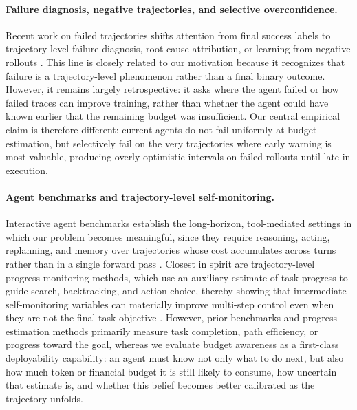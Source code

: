 \paragraph{Failure diagnosis, negative trajectories, and selective overconfidence.}
Recent work on failed trajectories shifts attention from final success labels to trajectory-level failure diagnosis, root-cause attribution, or learning from negative rollouts \cite{wang2024learningfromfailure,barke2026agentrx}. This line is closely related to our motivation because it recognizes that failure is a trajectory-level phenomenon rather than a final binary outcome. However, it remains largely retrospective: it asks where the agent failed or how failed traces can improve training, rather than whether the agent could have known earlier that the remaining budget was insufficient. Our central empirical claim is therefore different: current agents do not fail uniformly at budget estimation, but selectively fail on the very trajectories where early warning is most valuable, producing overly optimistic intervals on failed rollouts until late in execution.

\paragraph{Agent benchmarks and trajectory-level self-monitoring.}
Interactive agent benchmarks establish the long-horizon, tool-mediated settings in which our problem becomes meaningful, since they require reasoning, acting, replanning, and memory over trajectories whose cost accumulates across turns rather than in a single forward pass \cite{yao2023react,yao2022webshop,zhou2023webarena,liu2024agentbench,shridhar2021alfworld}. Closest in spirit are trajectory-level progress-monitoring methods, which use an auxiliary estimate of task progress to guide search, backtracking, and action choice, thereby showing that intermediate self-monitoring variables can materially improve multi-step control even when they are not the final task objective \cite{ma2019selfmonitoring,ma2019theregretful}. However, prior benchmarks and progress-estimation methods primarily measure task completion, path efficiency, or progress toward the goal, whereas we evaluate budget awareness as a first-class deployability capability: an agent must know not only what to do next, but also how much token or financial budget it is still likely to consume, how uncertain that estimate is, and whether this belief becomes better calibrated as the trajectory unfolds.

